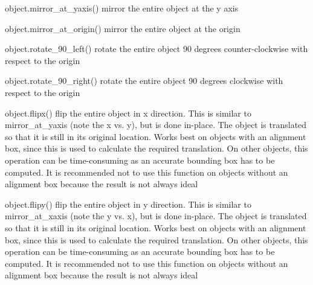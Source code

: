 \begin{APIfunc}{object.mirror\_at\_yaxis()}
    mirror the entire object at the y axis
    \begin{APIparameters}
    \end{APIparameters}
\end{APIfunc}
\begin{APIfunc}{object.mirror\_at\_origin()}
    mirror the entire object at the origin
    \begin{APIparameters}
    \end{APIparameters}
\end{APIfunc}
\begin{APIfunc}{object.rotate\_90\_left()}
    rotate the entire object 90 degrees counter-clockwise with respect to the origin
    \begin{APIparameters}
    \end{APIparameters}
\end{APIfunc}
\begin{APIfunc}{object.rotate\_90\_right()}
    rotate the entire object 90 degrees clockwise with respect to the origin
    \begin{APIparameters}
    \end{APIparameters}
\end{APIfunc}
\begin{APIfunc}{object.flipx()}
    flip the entire object in x direction. This is similar to mirror\_at\_yaxis (note the x vs. y), but is done in-place. The object is translated so that it is still in its original location. Works best on objects with an alignment box, since this is used to calculate the required translation. On other objects, this operation can be time-consuming as an accurate bounding box has to be computed. It is recommended not to use this function on objects without an alignment box because the result is not always ideal
    \begin{APIparameters}
    \end{APIparameters}
\end{APIfunc}
\begin{APIfunc}{object.flipy()}
    flip the entire object in y direction. This is similar to mirror\_at\_xaxis (note the y vs. x), but is done in-place. The object is translated so that it is still in its original location. Works best on objects with an alignment box, since this is used to calculate the required translation. On other objects, this operation can be time-consuming as an accurate bounding box has to be computed. It is recommended not to use this function on objects without an alignment box because the result is not always ideal
    \begin{APIparameters}
    \end{APIparameters}
\end{APIfunc}
